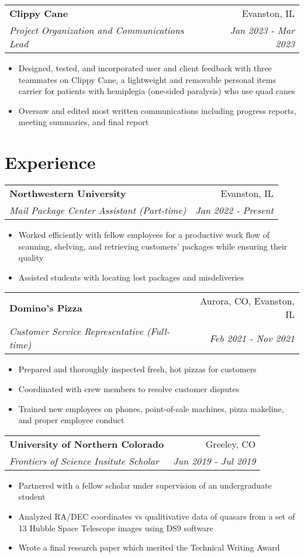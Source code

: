 \documentclass[letterpaper,20pt]{article}
\makeatletter
\newcommand{\resumeItemWithoutTitle}[1]{

  \item{
  }
  \vspace{-5pt}
}
\newcommand{\resumeSubheading}[4]{
  
  \vspace{2pt}
    \begin{tabular*}{0.97\textwidth}{l@{\extracolsep{\fill}}r}
      \textbf{#1} & #2 \\
      \textit{#3} & \textit{#4} \\
    \end{tabular*}\vspace{5pt}
}
\newcommand{\resumeItemListStart}{\begin{itemize}\vspace{-5pt}}
\newcommand{\resumeItemListEnd}{\end{itemize}}
\makeatother
\begin{document}
    \resumeSubheading{Clippy Cane}{Evanston, IL}
    {Project Organization and Communications Lead}{Jan 2023 - Mar 2023}
    \resumeItemListStart
        \resumeItemWithoutTitle{}
        {Designed, tested, and incorporated user and client feedback with three teammates on Clippy Cane, a lightweight and removable personal items carrier for patients with hemiplegia (one-sided paralysis) who use quad canes}
        \resumeItemWithoutTitle{}
        {Oversaw and edited most written communications including progress reports, meeting summaries, and final report}

        \resumeItemListEnd





\section{Experience}

    \resumeSubheading{Northwestern University}{Evanston, IL}
    {Mail Package Center Assistant (Part-time)}{Jan 2022 - Present}
    \resumeItemListStart

        \resumeItemWithoutTitle{}
        {Worked efficiently with fellow employees for a productive work flow of scanning, shelving, and retrieving customers’ packages while ensuring their quality}
        \resumeItemWithoutTitle{}
        {Assisted students with locating lost packages and misdeliveries}
  
    \resumeItemListEnd
\vspace{-5pt}
    \resumeSubheading
		{Domino's Pizza}{Aurora, CO, Evanston, IL}
		{Customer Service Representative (Full-time)}{Feb 2021 - Nov 2021}
		\resumeItemListStart

        \resumeItemWithoutTitle{}
          {Prepared and thoroughly inspected fresh, hot pizzas for customers}
        \resumeItemWithoutTitle{}
          {Coordinated with crew members to resolve customer disputes}
        \resumeItemWithoutTitle{}
        {Trained new employees on phones, point-of-sale machines, pizza makeline, and proper employee conduct}

		\resumeItemListEnd

\vspace{-5pt}
    \resumeSubheading
		{University of Northern Colorado}{Greeley, CO}
		{Frontiers of Science Insitute Scholar}{Jun 2019 - Jul 2019}
		\resumeItemListStart
        \resumeItemWithoutTitle{}
          {Partnered with a fellow scholar under supervision of an undergraduate student}
        \resumeItemWithoutTitle{}
          {Analyzed RA/DEC coordinates vs qualitivative data of quasars from a set of 13 Hubble Space Telescope images using DS9 software}
        \resumeItemWithoutTitle{}
        {Wrote a final research paper which merited the Technical Writing Award}
		\resumeItemListEnd
\end{document}
